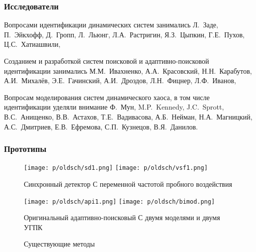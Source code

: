 \documentclass[14pt,handout,utf8]{beamer}
\newlength\TW
\begin{document}

\begin{frame}
  \frametitle{Исследователи}

  Вопросами идентификации динамических систем занимались
  Л.~Заде,
  П.~Эйкхофф,
  Д.~Гропп,
  Л.~Льюнг,
  Л.А.~Растригин,
  Я.З.~Цыпкин,
  Г.Е.~Пухов,
  Ц.С.~Хатиашвили,

  \vfill


  Созданием и разработкой систем поисковой и адаптивно-поисковой идентификации занимались
  М.М.~Ивахненко,
  А.А.~Красовский,
  Н.Н.~Карабутов,
  А.И.~Михалёв,
  Э.Е.~Гачинский,
  А.И.~Дроздов,
  Л.Н.~Фицнер,
  Л.Ф.~Иванов,

  \vfill

  Вопросам моделирования систем динамического хаоса, в том числе идентификации уделяли внимание
  Ф.~Мун,
  M.P.~Kennedy,
  J.C.~Sprott,
  В.С.~Анищенко,
  В.В.~Астахов,
  Т.Е.~Вадивасова,
  А.Б.~Нейман,
  Н.А.~Магницкий,
  А.С.~Дмитриев,
  Е.В.~Ефремова,
  С.П.~Кузнецов,
  В.Я.~Данилов.



\end{frame}


\begin{frame}
  \frametitle{Прототипы}

  \begin{figure}[h!]
    \centerline{
      \texttt{[image: p/oldsch/sd1.png]}
      \hfill
      \texttt{[image: p/oldsch/vsf1.png]}
    }
    \centerline{
      {Синхронный детектор}
      \hfill
      {С переменной частотой пробного воздействия}
    }
    \centerline{
      \texttt{[image: p/oldsch/api1.png]}
      \hfill
      \texttt{[image: p/oldsch/bimod.png]}
    }
    \centerline{
      {Оригинальный адаптивно-поисковый}
      \hfill
      {С  двумя моделями и двумя УГПК}
    }
    \label{atu:f:oldsch}
    \caption{Существующие методы}
  \end{figure}



\end{frame}








\end{document}
